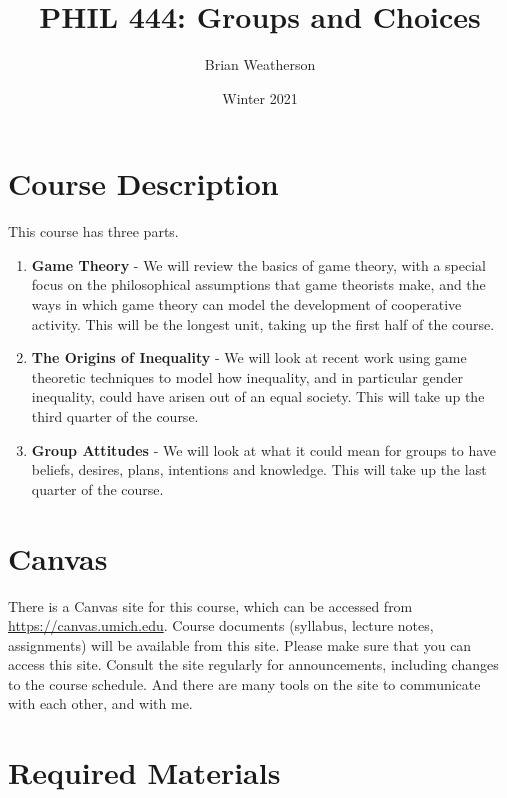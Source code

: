 \documentclass[
]{article}
\title{PHIL 444: Groups and Choices}
\author{Brian Weatherson}
\date{Winter 2021}
\providecommand{\tightlist}{%
  \setlength{\itemsep}{0pt}\setlength{\parskip}{0pt}}
\begin{document}
\maketitle

\hypertarget{course-description}{%
\section{Course Description}\label{course-description}}

This course has three parts.

\begin{enumerate}
\def\labelenumi{\arabic{enumi}.}
\tightlist
\item
  \textbf{Game Theory} - We will review the basics of game theory, with
  a special focus on the philosophical assumptions that game theorists
  make, and the ways in which game theory can model the development of
  cooperative activity. This will be the longest unit, taking up the
  first half of the course.
\item
  \textbf{The Origins of Inequality} - We will look at recent work using
  game theoretic techniques to model how inequality, and in particular
  gender inequality, could have arisen out of an equal society. This
  will take up the third quarter of the course.
\item
  \textbf{Group Attitudes} - We will look at what it could mean for
  groups to have beliefs, desires, plans, intentions and knowledge. This
  will take up the last quarter of the course.
\end{enumerate}

\hypertarget{canvas}{%
\section{Canvas}\label{canvas}}

There is a Canvas site for this course, which can be accessed from
\url{https://canvas.umich.edu}. Course documents (syllabus, lecture
notes, assignments) will be available from this site. Please make sure
that you can access this site. Consult the site regularly for
announcements, including changes to the course schedule. And there are
many tools on the site to communicate with each other, and with me.

\hypertarget{required-materials}{%
\section{Required Materials}\label{required-materials}}
\end{document}
